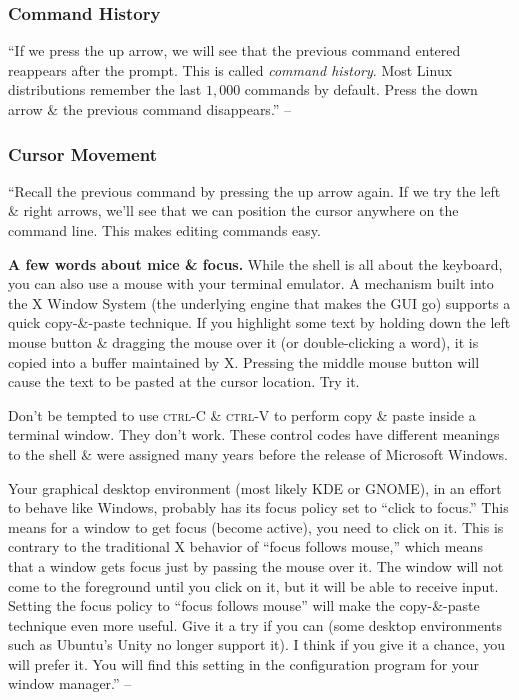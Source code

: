 \documentclass[oneside]{book}
\numberwithin{equation}{section}
\begin{document}
\subsubsection{Command History}
``If we press the up arrow, we will see that the previous command entered reappears after the prompt. This is called \textit{command history}. Most Linux distributions remember the last $1,000$ commands by default. Press the down arrow \& the previous command disappears.'' -- \cite[p. 39]{Shotts2019}

\subsubsection{Cursor Movement}
``Recall the previous command by pressing the up arrow again. If we try the left \& right arrows, we'll see that we can position the cursor anywhere on the command line. This makes editing commands easy.

\textbf{A few words about mice \& focus.} While the shell is all about the keyboard, you can also use a mouse with your terminal emulator. A mechanism built into the X Window System (the underlying engine that makes the GUI go) supports a quick copy-\&-paste technique. If you highlight some text by holding down the left mouse button \& dragging the mouse over it (or double-clicking a word), it is copied into a buffer maintained by X. Pressing the middle mouse button will cause the text to be pasted at the cursor location. Try it.

Don't be tempted to use \textsc{ctrl-C} \& \textsc{ctrl-V} to perform copy \& paste inside a terminal window. They don't work. These control codes have different meanings to the shell \& were assigned many years before the release of Microsoft Windows.

Your graphical desktop environment (most likely KDE or GNOME), in an effort to behave like Windows, probably has its focus policy set to ``click to focus.'' This means for a window to get focus (become active), you need to click on it. This is contrary to the traditional X behavior of ``focus follows mouse,'' which means that a window gets focus just by passing the mouse over it. The window will not come to the foreground until you click on it, but it will be able to receive input. Setting the focus policy to ``focus follows mouse'' will make the copy-\&-paste technique even more useful. Give it a try if you can (some desktop environments such as Ubuntu's Unity no longer support it). I think if you give it a chance, you will prefer it. You will find this setting in the configuration program for your window manager.'' -- \cite[p. 40]{Shotts2019}
\end{document}
